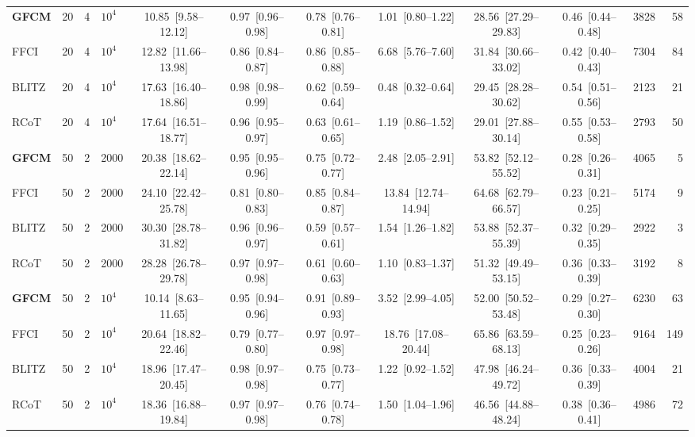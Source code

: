 {\begin{tabular}{lrrlccccccrr}
\midrule
\textbf{GFCM} & 20 & 4 & $10^4$ & 10.85~[9.58--12.12] & 0.97~[0.96--0.98] & 0.78~[0.76--0.81] & 1.01~[0.80--1.22] & 28.56~[27.29--29.83] & 0.46~[0.44--0.48] & 3828 & 58 \\
FFCI & 20 & 4 & $10^4$ & 12.82~[11.66--13.98] & 0.86~[0.84--0.87] & 0.86~[0.85--0.88] & 6.68~[5.76--7.60] & 31.84~[30.66--33.02] & 0.42~[0.40--0.43] & 7304 & 84 \\
BLITZ & 20 & 4 & $10^4$ & 17.63~[16.40--18.86] & 0.98~[0.98--0.99] & 0.62~[0.59--0.64] & 0.48~[0.32--0.64] & 29.45~[28.28--30.62] & 0.54~[0.51--0.56] & 2123 & 21 \\
RCoT & 20 & 4 & $10^4$ & 17.64~[16.51--18.77] & 0.96~[0.95--0.97] & 0.63~[0.61--0.65] & 1.19~[0.86--1.52] & 29.01~[27.88--30.14] & 0.55~[0.53--0.58] & 2793 & 50 \\
\midrule
\textbf{GFCM} & 50 & 2 & 2000 & 20.38~[18.62--22.14] & 0.95~[0.95--0.96] & 0.75~[0.72--0.77] & 2.48~[2.05--2.91] & 53.82~[52.12--55.52] & 0.28~[0.26--0.31] & 4065 & 5 \\
FFCI & 50 & 2 & 2000 & 24.10~[22.42--25.78] & 0.81~[0.80--0.83] & 0.85~[0.84--0.87] & 13.84~[12.74--14.94] & 64.68~[62.79--66.57] & 0.23~[0.21--0.25] & 5174 & 9 \\
BLITZ & 50 & 2 & 2000 & 30.30~[28.78--31.82] & 0.96~[0.96--0.97] & 0.59~[0.57--0.61] & 1.54~[1.26--1.82] & 53.88~[52.37--55.39] & 0.32~[0.29--0.35] & 2922 & 3 \\
RCoT & 50 & 2 & 2000 & 28.28~[26.78--29.78] & 0.97~[0.97--0.98] & 0.61~[0.60--0.63] & 1.10~[0.83--1.37] & 51.32~[49.49--53.15] & 0.36~[0.33--0.39] & 3192 & 8 \\
\midrule
\textbf{GFCM} & 50 & 2 & $10^4$ & 10.14~[8.63--11.65] & 0.95~[0.94--0.96] & 0.91~[0.89--0.93] & 3.52~[2.99--4.05] & 52.00~[50.52--53.48] & 0.29~[0.27--0.30] & 6230 & 63 \\
FFCI & 50 & 2 & $10^4$ & 20.64~[18.82--22.46] & 0.79~[0.77--0.80] & 0.97~[0.97--0.98] & 18.76~[17.08--20.44] & 65.86~[63.59--68.13] & 0.25~[0.23--0.26] & 9164 & 149 \\
BLITZ & 50 & 2 & $10^4$ & 18.96~[17.47--20.45] & 0.98~[0.97--0.98] & 0.75~[0.73--0.77] & 1.22~[0.92--1.52] & 47.98~[46.24--49.72] & 0.36~[0.33--0.39] & 4004 & 21 \\
RCoT & 50 & 2 & $10^4$ & 18.36~[16.88--19.84] & 0.97~[0.97--0.98] & 0.76~[0.74--0.78] & 1.50~[1.04--1.96] & 46.56~[44.88--48.24] & 0.38~[0.36--0.41] & 4986 & 72 \\
\bottomrule
\end{tabular}}
